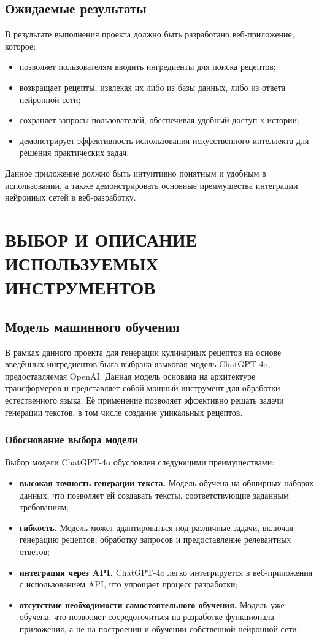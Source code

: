 {\subsection*{Ожидаемые результаты}
В результате выполнения проекта должно быть разработано веб-приложение, которое:
\begin{itemize}
    \item позволяет пользователям вводить ингредиенты для поиска рецептов;
    \item возвращает рецепты, извлекая их либо из базы данных, либо из ответа нейронной сети;
    \item сохраняет запросы пользователей, обеспечивая удобный доступ к истории;
    \item демонстрирует эффективность использования искусственного интеллекта для решения практических задач.
\end{itemize}

Данное приложение должно быть интуитивно понятным и удобным в использовании, а также демонстрировать основные преимущества интеграции нейронных сетей в веб-разработку.

\newpage
  
\section{\MakeUppercase{Выбор и описание используемых инструментов}}
{
    \subsection{Модель машинного обучения}
    В рамках данного проекта для генерации кулинарных рецептов на основе введённых ингредиентов была выбрана языковая модель ChatGPT-4o, предоставляемая OpenAI. Данная модель основана на архитектуре трансформеров и представляет собой мощный инструмент для обработки естественного языка. Её применение позволяет эффективно решать задачи генерации текстов, в том числе создание уникальных рецептов.

\subsubsection*{Обоснование выбора модели}
Выбор модели ChatGPT-4o обусловлен следующими преимуществами:
\begin{itemize}
    \item \textbf{высокая точность генерации текста.} Модель обучена на обширных наборах данных, что позволяет ей создавать тексты, соответствующие заданным требованиям;
    \item \textbf{гибкость.} Модель может адаптироваться под различные задачи, включая генерацию рецептов, обработку запросов и предоставление релевантных ответов;
    \item \textbf{интеграция через API.} ChatGPT-4o легко интегрируется в веб-приложения с использованием API, что упрощает процесс разработки;
    \item \textbf{отсутствие необходимости самостоятельного обучения.} Модель уже обучена, что позволяет сосредоточиться на разработке функционала приложения, а не на построении и обучении собственной нейронной сети.
\end{itemize}

}}
